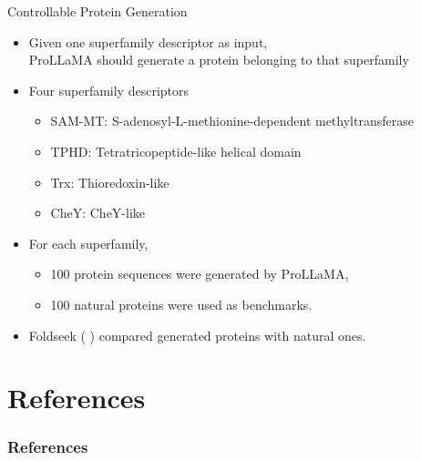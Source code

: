 \documentclass[dvipsnames,
hyperref={
	citecolor=blue,
	colorlinks=true,
	urlcolor=blue,
	linkcolor=,
}
]{beamer}
\let\oldcite\cite
\renewcommand{\cite}[1]{{\color{blue} \oldcite{#1}}}
\begin{document}




\begin{frame}{Controllable Protein Generation}%
	\begin{itemize}
		\item Given one superfamily descriptor as input, 
		\\ProLLaMA should generate a protein belonging to that superfamily
		\item Four superfamily descriptors
		\begin{itemize}
			\item SAM-MT: S-adenosyl-L-methionine-dependent methyltransferase
			\item TPHD: Tetratricopeptide-like helical domain
			\item Trx: Thioredoxin-like 
			\item CheY: CheY-like
		\end{itemize}
		\item For each superfamily,
		\begin{itemize}
			\item 100 protein sequences were generated by ProLLaMA,
			\item 100 natural proteins were used as benchmarks.
		\end{itemize}
		\item Foldseek (\cite{van2024fast}) compared generated proteins with natural ones.
	\end{itemize}
\end{frame}















\section{References}
\begin{frame}[allowframebreaks]
\frametitle{References}
\printbibliography
\end{frame}




\end{document}
